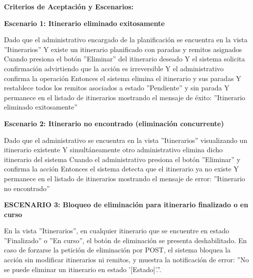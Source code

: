 \documentclass[a4paper,9pt]{article}
\begin{document}
\begin{tcolorbox}[hucard, title={\textbf{HU-48: ELIMINAR ITINERARIO} \hfill \scriptsize \colorbox{tealstatus}{\textbf{\ Accepted\ }} \quad \colorbox{white}{\textcolor{primarydark}{\textbf{\ 2 pts\ }}}}]
{}\par\vspace{3pt}
\noindent\textbf{\footnotesize Criterios de Aceptación y Escenarios:}\par\vspace{2pt}
{\footnotesize
\noindent\textbf{\textcolor{secondarydark}{Escenario 1:  Itinerario eliminado exitosamente}}\par\vspace{1pt}
Dado que el administrativo encargado de la planificación se encuentra en la vista ''Itinerarios'' Y existe un itinerario planificado con paradas y remitos asignados Cuando presiona el botón ''Eliminar'' del itinerario deseado Y el sistema solicita confirmación advirtiendo que la acción es irreversible Y el administrativo confirma la operación Entonces el sistema elimina el itinerario y sus paradas Y restablece todos los remitos asociados a estado ''Pendiente'' y sin parada Y permanece en el listado de itinerarios mostrando el mensaje de éxito: ''Itinerario eliminado exitosamente''\par\vspace{2.5pt}
\noindent\textbf{\textcolor{secondarydark}{Escenario 2:  Itinerario no encontrado (eliminación concurrente)}}\par\vspace{1pt}
Dado que el administrativo se encuentra en la vista ''Itinerarios'' visualizando un itinerario existente Y simultáneamente otro administrativo elimina dicho itinerario del sistema Cuando el administrativo presiona el botón ''Eliminar'' y confirma la acción Entonces el sistema detecta que el itinerario ya no existe Y permanece en el listado de itinerarios mostrando el mensaje de error: ''Itinerario no encontrado''\par\vspace{2.5pt}
\noindent\textbf{\textcolor{secondarydark}{ESCENARIO 3:  Bloqueo de eliminación para itinerario finalizado o en curso}}\par\vspace{1pt}
En la vista ''Itinerarios'', en cualquier itinerario que se encuentre en estado ''Finalizado'' o ''En curso'', el botón de eliminación se presenta deshabilitado. En caso de forzarse la petición de eliminación por POST, el sistema bloquea la acción sin modificar itinerarios ni remitos, y muestra la notificación de error: ''No se puede eliminar un itinerario en estado '[Estado]'.''.\par\vspace{2.5pt}
}\par
\end{tcolorbox}
\end{document}
